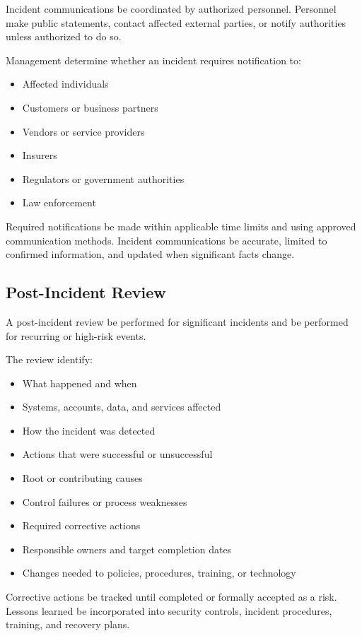 Incident communications \must{} be coordinated by authorized personnel. Personnel \mustnot{} make public statements, contact affected external parties, or notify authorities unless authorized to do so.

Management \must{} determine whether an incident requires notification to:
\begin{itemize}
    \item Affected individuals
    \item Customers or business partners
    \item Vendors or service providers
    \item Insurers
    \item Regulators or government authorities
    \item Law enforcement
\end{itemize}

Required notifications \must{} be made within applicable time limits and using approved communication methods. Incident communications \should{} be accurate, limited to confirmed information, and updated when significant facts change.

\subsection{Post-Incident Review}

A post-incident review \must{} be performed for significant incidents and \should{} be performed for recurring or high-risk events.

The review \should{} identify:
\begin{itemize}
    \item What happened and when
    \item Systems, accounts, data, and services affected
    \item How the incident was detected
    \item Actions that were successful or unsuccessful
    \item Root or contributing causes
    \item Control failures or process weaknesses
    \item Required corrective actions
    \item Responsible owners and target completion dates
    \item Changes needed to policies, procedures, training, or technology
\end{itemize}

Corrective actions \must{} be tracked until completed or formally accepted as a risk. Lessons learned \should{} be incorporated into security controls, incident procedures, training, and recovery plans.

